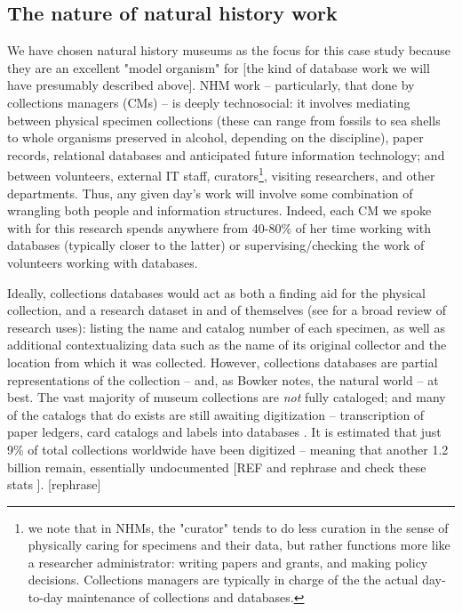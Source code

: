 \subsection{The nature of natural history work}

We have chosen natural history museums as the focus for this case study because they are an excellent "model organism" for [the kind of database work we will have presumably described above]. NHM work -- particularly, that done by collections managers (CMs) -- is deeply technosocial: it involves mediating between physical specimen collections (these can range from fossils to sea shells to whole organisms preserved in alcohol, depending on the discipline), paper records, relational databases and anticipated future information technology; and between volunteers, external IT staff, curators\footnote{we note that in NHMs, the "curator" tends to do less curation in the sense of physically caring for specimens and their data, but rather functions more like a researcher administrator: writing papers and grants, and making policy decisions. Collections managers are typically in charge of the the actual day-to-day maintenance of collections and databases.}, visiting researchers, and other departments. Thus, any given day’s work will involve some combination of wrangling both people and information structures. Indeed, each CM we spoke with for this research spends anywhere from 40-80\% of her time working with databases (typically closer to the latter) or supervising/checking the work of volunteers working with databases.

Ideally, collections databases would act as both a finding aid for the physical collection, and a research dataset in and of themselves (see \cite{Chapman2005} for a broad review of research uses): listing the name and catalog number of each specimen, as well as additional contextualizing data such as the name of its original collector and the location from which it was collected. However, collections databases are partial representations of the collection -- and, as Bowker notes, the natural world \cite{Bowker_2000} -- at best. The vast majority of museum collections are \textit{not} fully cataloged; and many of the catalogs that do exists are still awaiting digitization -- transcription of paper ledgers, card catalogs and labels into databases \cite{Beaman_2012}. It is estimated that just 9\% of total collections worldwide have been digitized -- meaning that another 1.2 billion remain, essentially undocumented [REF and rephrase and check these stats \cite{Ari_o_2010}]. [rephrase]

